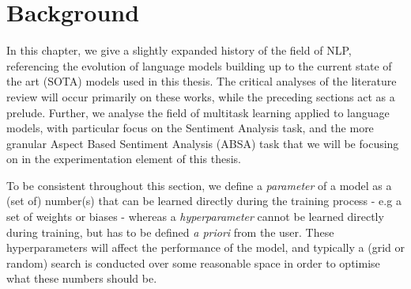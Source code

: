 

\chapter{Background} \label{chapter:background}
In this chapter, we give a slightly expanded history of the field of NLP, referencing the evolution of language models building up to the current state of the art (SOTA) models used in this thesis. The critical analyses of the literature review will occur primarily on these works, while the preceding sections act as a prelude. Further, we analyse the field of multitask learning applied to language models, with particular focus on the Sentiment Analysis task, and the more granular Aspect Based Sentiment Analysis (ABSA) task that we will be focusing on in the experimentation element of this thesis.

To be consistent throughout this section, we define a \textit{parameter} of a model as a (set of) number(s) that can be learned directly during the training process - e.g a set of weights or biases - whereas a \textit{hyperparameter} cannot be learned directly during training, but has to be defined \textit{a priori} from the user. These hyperparameters will affect the performance of the model, and typically a (grid or random) search is conducted over some reasonable space in order to optimise what these numbers should be.

